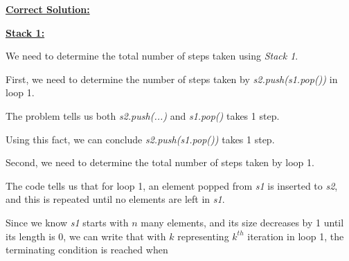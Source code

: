 \documentclass[12pt]{article}
\begin{document}
\begin{enumerate}[a.]







    \begin{mdframed}

    \underline{\textbf{Correct Solution:}}

    \bigskip

    \underline{\textbf{Stack 1:}}

    \bigskip

    We need to determine the total number of steps taken using \textit{Stack 1}.

    \bigskip

    First, we need to determine the number of steps taken by \textit{s2.push(s1.pop())} \color{red}in loop 1\color{black}.

    \bigskip

    The problem tells us both \textit{s2.push(...)} and \textit{s1.pop()} takes 1 step.

    \bigskip

    Using this fact, we can conclude \textit{s2.push(s1.pop())} takes 1 step.

    \bigskip

    Second, we need to determine the total number of steps taken by loop 1.

    \bigskip

    The code tells us that for loop 1, an element popped from \textit{s1} is inserted to \textit{s2},
    and this is repeated until no elements are left in \textit{s1}.

    \bigskip

    Since we know \textit{s1} starts with $n$ many elements, and its size decreases
    by 1 until its length is 0, we can write that with $k$ representing
    $k^{th}$ iteration in loop 1, the terminating condition is reached when


\end{mdframed}
\end{enumerate}
\end{document}
